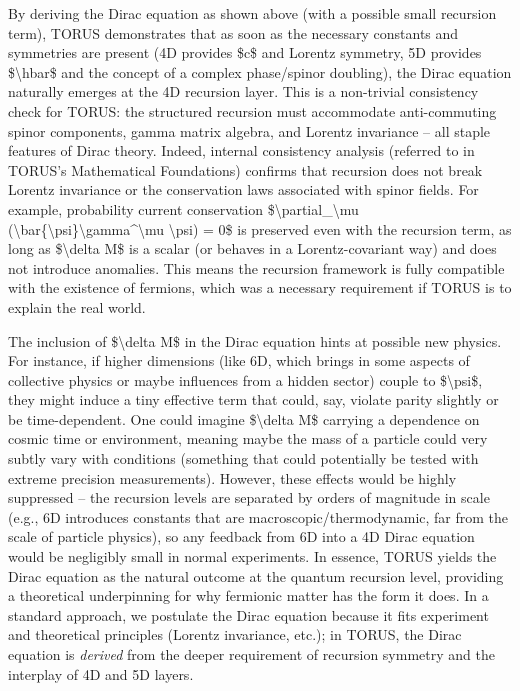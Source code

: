 \documentclass[]{article}
\begin{document}
By deriving the Dirac equation as shown above (with a possible small
recursion term), TORUS demonstrates that as soon as the necessary
constants and symmetries are present (4D provides \$c\$ and Lorentz
symmetry, 5D provides \$\textbackslash{}hbar\$ and the concept of a
complex phase/spinor doubling), the Dirac equation naturally emerges at
the 4D recursion layer. This is a non-trivial consistency check for
TORUS: the structured recursion must accommodate anti-commuting spinor
components, gamma matrix algebra, and Lorentz invariance -- all staple
features of Dirac theory. Indeed, internal consistency analysis
(referred to in TORUS's Mathematical Foundations) confirms that
recursion does not break Lorentz invariance or the conservation laws
associated with spinor fields. For example, probability current
conservation \$\textbackslash{}partial\_\textbackslash{}mu
(\textbackslash{}bar\{\textbackslash{}psi\}\textbackslash{}gamma\^{}\textbackslash{}mu
\textbackslash{}psi) = 0\$ is preserved even with the recursion term, as
long as \$\textbackslash{}delta M\$ is a scalar (or behaves in a
Lorentz-covariant way) and does not introduce anomalies. This means the
recursion framework is fully compatible with the existence of fermions,
which was a necessary requirement if TORUS is to explain the real world.

The inclusion of \$\textbackslash{}delta M\$ in the Dirac equation hints
at possible new physics. For instance, if higher dimensions (like 6D,
which brings in some aspects of collective physics or maybe influences
from a hidden sector) couple to \$\textbackslash{}psi\$, they might
induce a tiny effective term that could, say, violate parity slightly or
be time-dependent. One could imagine \$\textbackslash{}delta M\$
carrying a dependence on cosmic time or environment, meaning maybe the
mass of a particle could very subtly vary with conditions (something
that could potentially be tested with extreme precision measurements).
However, these effects would be highly suppressed -- the recursion
levels are separated by orders of magnitude in scale (e.g., 6D
introduces constants that are macroscopic/thermodynamic, far from the
scale of particle physics), so any feedback from 6D into a 4D Dirac
equation would be negligibly small in normal experiments. In essence,
TORUS yields the Dirac equation as the natural outcome at the quantum
recursion level, providing a theoretical underpinning for why fermionic
matter has the form it does. In a standard approach, we postulate the
Dirac equation because it fits experiment and theoretical principles
(Lorentz invariance, etc.); in TORUS, the Dirac equation is
\emph{derived} from the deeper requirement of recursion symmetry and the
interplay of 4D and 5D layers.
\end{document}
